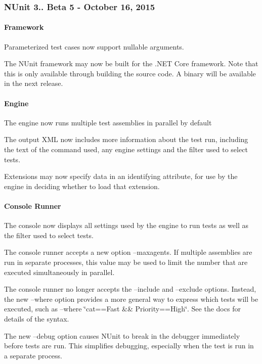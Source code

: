 \subsubsection*{N\+Unit 3.. Beta 5 -\/ October 16, 2015}

\paragraph*{Framework}


\begin{DoxyItemize}
\item Parameterized test cases now support nullable arguments.
\item The N\+Unit framework may now be built for the .N\+ET Core framework. Note that this is only available through building the source code. A binary will be available in the next release.
\end{DoxyItemize}

\paragraph*{Engine}


\begin{DoxyItemize}
\item The engine now runs multiple test assemblies in parallel by default
\item The output X\+ML now includes more information about the test run, including the text of the command used, any engine settings and the filter used to select tests.
\item Extensions may now specify data in an identifying attribute, for use by the engine in deciding whether to load that extension.
\end{DoxyItemize}

\paragraph*{Console Runner}


\begin{DoxyItemize}
\item The console now displays all settings used by the engine to run tests as well as the filter used to select tests.
\item The console runner accepts a new option --maxagents. If multiple assemblies are run in separate processes, this value may be used to limit the number that are executed simultaneously in parallel.
\item The console runner no longer accepts the --include and --exclude options. Instead, the new --where option provides a more general way to express which tests will be executed, such as --where \char`\"{}cat==\+Fast \&\& Priority==\+High\char`\"{}. See the docs for details of the syntax.
\item The new --debug option causes N\+Unit to break in the debugger immediately before tests are run. This simplifies debugging, especially when the test is run in a separate process.
\end{DoxyItemize}

